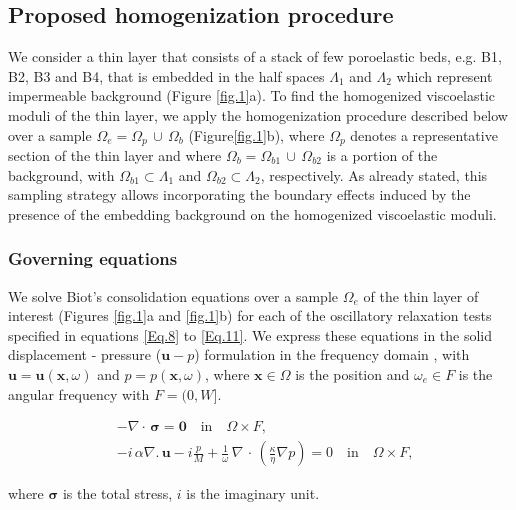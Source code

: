 \documentclass[draft]{agujournal2019}
\begin{document}
\subsection{Proposed homogenization procedure}
We consider a thin layer that consists of a stack of few poroelastic beds, e.g. B1, B2, B3 and B4, that is embedded in the half spaces $\Lambda_1$ and $\Lambda_2$ which represent impermeable background (Figure \ref{fig.1}a). To find the homogenized viscoelastic moduli of the thin layer, we apply the homogenization procedure described below over a sample $\Omega_e = \Omega_p \,\cup \, \Omega_b$ (Figure\ref{fig.1}b), where $\Omega_p$ denotes a representative section of the thin  layer and where  $\Omega_b =\Omega_{b1}\, \cup \, \Omega_{b2}$ is a portion of the background, with $\Omega_{b1} \subset \Lambda_1$ and $\Omega_{b2} \subset \Lambda_2$, respectively. As already stated, this sampling strategy allows incorporating the boundary effects induced by the presence of the embedding background on the homogenized viscoelastic moduli.


\subsubsection{Governing equations}
We solve Biot's consolidation equations \cite{Biot1941, Biot1962} over a sample  $\Omega_e$ of the thin layer of interest (Figures \ref{fig.1}a and \ref{fig.1}b) for each of the oscillatory relaxation tests specified in equations
\eqref{Eq.8} to \eqref{Eq.11}. We express these equations in the solid displacement - pressure ($\bm{u}-p$) formulation in the frequency domain \cite{Quintal2011,Favino2020},  with $\bm{u} = \bm{u}(\bm{x}, \omega)$ and $p = p(\bm{x},\omega)$, where $\bm{x} \in \Omega$ is the position  and $\omega_e \in F$ is the angular frequency with $F =(0,W]$. 
\begin{linenomath*}
\begin{equation}\label{Eq.6}
\begin{split}
& - \nabla \cdot \, \bm{\sigma} = \bm{0}  \quad  \textrm{in} \quad \Omega \times F,  \\
& - i \, \alpha \nabla . \, \bm{u} -i \frac{p}{M} + \frac{1}{\omega} \,\nabla \, \cdot \, \left( \frac{\kappa}{\eta} \nabla p\right)  =0 \quad  \textrm{in} \quad \Omega \times F,
\end{split}
\end{equation}
\end{linenomath*}
where $\bm{\sigma}$ is the total stress, $i$ is the imaginary unit.
\end{document}
